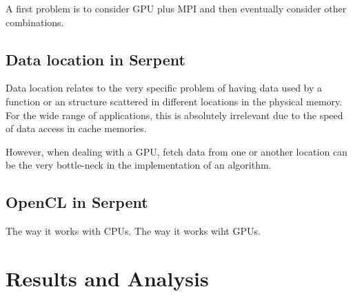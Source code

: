 \documentclass[twoside,a4paper,12pt,english,draft]{anstrans}
\renewcommand{\vec}[1]{\bm{#1}} %
\newcommand{\vd}{\bm{\cdot}} %
\newcommand{\grad}{\vec{\nabla}} %
\newcommand{\ud}{\mathop{}\!\mathrm{d}} %
\begin{document}
A first problem is to consider GPU plus MPI and then eventually consider other combinations.

\subsection{Data location in Serpent}

Data location relates to the very specific problem of having data used by a function or an
structure scattered in different locations in the physical memory. For the wide range of
applications, this is absolutely irrelevant due to the speed of data access in cache memories.

However, when dealing with a GPU, fetch data from one or another location can be the very
bottle-neck in the implementation of an algorithm.

\subsection{OpenCL in Serpent}

The way it works with CPUs.
The way it works wiht GPUs.

\iffalse
\begin{subequations} \label{eqs:fullTransport}
\begin{multline} \label{eq:fullTransportVol}
  \vec{\Omega}\vd \grad \psi(\vec{x}, \vec{\Omega})
  + \sigma(\vec{x}) \psi (\vec{x}, \vec{\Omega})
\\ =
  \frac{\sigma_s(\vec{x})}{4\pi} \int_{4\pi} \psi(\vec{x},\vec{\Omega}')
  \ud\Omega' + \frac{q(\vec{x})}{4\pi}
  \equiv \frac{1}{4\pi} Q(\vec{x}) \,,
\end{multline}
inside $\vec{x} \in V$, $\vec{\Omega} \in 4\pi$, with an incident boundary
condition
\begin{equation} \label{eq:fullTransportBndy}
  \psi(\vec{x}, \vec{\Omega}) = \psi^b(\vec{x}, \vec{\Omega}) \,,
 \quad \vec{x} \in \partial V, \ \vec{\Omega} \vd \vec{n} < 0\,.
\end{equation}
\end{subequations}
\fi

\section{Results and Analysis}
\end{document}
